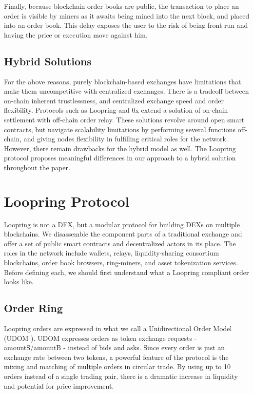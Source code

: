 \documentclass[UTF8,nofonts]{article}
\begin{document}
\begin{multicols}{2}
Finally, because blockchain order books are public, the transaction to place an order is visible by miners as it awaits being mined into the next block, and placed into an order book. This delay exposes the user to the risk of being front run and having the price or execution move against him.

\subsection{Hybrid Solutions}
For the above reasons, purely blockchain-based exchanges have limitations that make them uncompetitive with centralized exchanges. There is a tradeoff between on-chain inherent trustlessness, and centralized exchange speed and order flexibility. Protocols such as Loopring and 0x \cite{warren20170x} extend a solution of on-chain settlement with off-chain order relay. These solutions revolve around open smart contracts, but navigate scalability limitations by performing several functions off-chain, and giving nodes flexibility in fulfilling critical roles for the network. However, there remain drawbacks\cite{costofdecent} for the hybrid model as well. The Loopring protocol proposes meaningful differences in our approach to a hybrid solution throughout the paper.


\section{Loopring Protocol\label{sec:loopring_protocol}}
Loopring is not a DEX, but a modular protocol for building DEXs on multiple blockchains. We disassemble the component parts of a traditional exchange and offer a set of public smart contracts and decentralized actors in its place. The roles in the network include wallets, relays, liquidity-sharing consortium blockchains, order book browsers, ring-miners, and asset tokenization services. Before defining each, we should first understand what a Loopring compliant order looks like. 

\subsection{Order Ring\label{sec:order_ring}}
Loopring orders are expressed in what we call a Unidirectional Order Model (UDOM \cite{coinport2014udom}). UDOM expresses orders as token exchange requests - amountS/amountB - instead of bids and asks. Since every order is just an exchange rate between two tokens, a powerful feature of the protocol is the mixing and matching of multiple orders in circular trade. By using up to 10 orders instead of a single trading pair, there is a dramatic increase in liquidity and potential for price improvement. 


\end{multicols}
\end{document}
